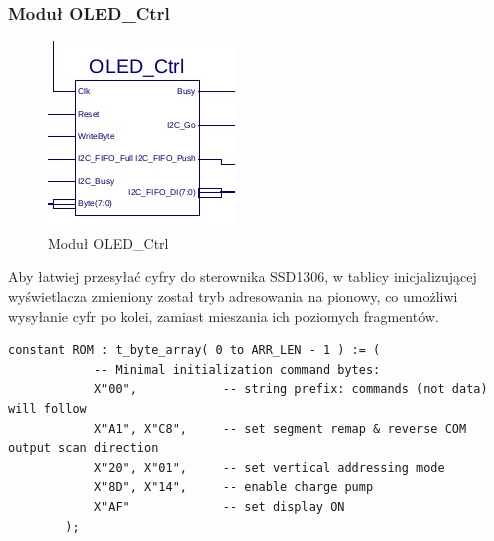 \documentclass[]{article}
\begin{document}
	\subsubsection{Moduł OLED\_Ctrl}
	\begin{figure}[H]
		\includegraphics[width=.4\linewidth]{img/oled_ctrl.jpg}
		\centering
		\caption{Moduł OLED\_Ctrl}
		\label{fig:oledctrl}
	\end{figure}
	Aby łatwiej przesyłać cyfry do sterownika SSD1306, w tablicy inicjalizującej wyświetlacza zmieniony został tryb adresowania na pionowy, co umożliwi wysyłanie cyfr po kolei, zamiast mieszania ich poziomych fragmentów.
	\noindent\begin{lstlisting}[style=vhdl, autogobble=true, label={lst:mem}, caption={Funcja inicjalizacji pamięci w module Selector}, captionpos=b]
		constant ROM : t_byte_array( 0 to ARR_LEN - 1 ) := ( 
			-- Minimal initialization command bytes:
			X"00",            -- string prefix: commands (not data) will follow
			X"A1", X"C8",     -- set segment remap & reverse COM output scan direction
			X"20", X"01",     -- set vertical addressing mode
			X"8D", X"14",     -- enable charge pump
			X"AF"             -- set display ON
		);
	\end{lstlisting}
\end{document}
